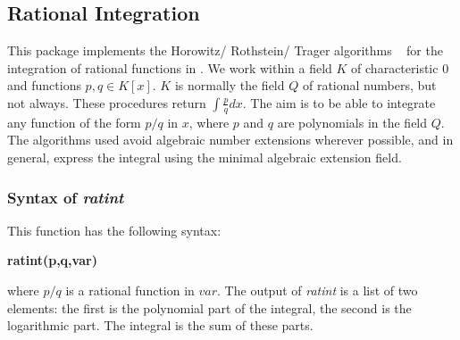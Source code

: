 
\subsection{Rational Integration}

This package implements the Horowitz/ Rothstein/ Trager algorithms ~\cite{Geddes:92} for the integration of rational functions in \REDUCE. We work within a field $K$ of characteristic $0$ and functions $p,q \in K[x]$. $K$ is normally the field $Q$ of rational numbers, but not always. These procedures return $\int \frac{p}{q} dx.$
 The aim is to be able to integrate any function of the form $p/q$ in $x$, where $p$ and $q$ are polynomials in the field $Q$. The algorithms used avoid algebraic number extensions wherever possible, and in general, express the integral using the minimal algebraic extension field. 

\subsubsection{Syntax of \emph{ratint}}
This function has the following syntax:
\begin{center} \textbf{ratint(p,q,var)} \end{center}
where $p/q$ is a rational function in $var$. The output of \emph{ratint} is a list of two elements: the first is the polynomial part of the integral, the second is the logarithmic part. The integral is the sum of these parts.
